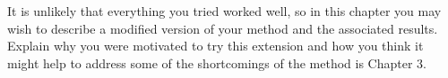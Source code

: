 It is unlikely that everything you tried worked well, so in this chapter you may
wish to describe a modified version of your method and the associated results.
Explain why you were motivated to try this extension and how you think it might
help to address some of the shortcomings of the method is Chapter 3.
